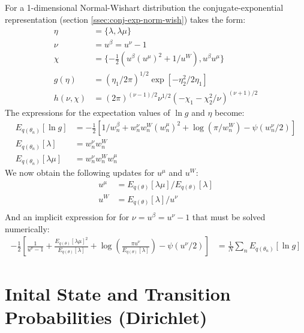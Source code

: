 For a 1-dimensional Normal-Wishart distribution the conjugate-exponential representation (section \ref{ssec:conj-exp-norm-wish}) takes the form:
\begin{align}
  \eta &= \{ \lambda, \lambda \mu \} \\
  \nu &= u^\beta = u^\nu - 1 \\
  \chi &= \{ -\tfrac{1}{2}(u^\beta (u^\mu)^2 + 1/u^W), u^\beta u^\mu \} \\
  g(\eta) &= (\eta_1 / 2\pi)^{1/2} \exp [-\eta_2^2 / 2 \eta_1] \\
  h(\nu, \chi) &= (2 \pi)^{(\nu-1)/2}  \nu^{1/2}  (-\chi_1 - \chi_2^2/\nu)^{(\nu+1)/2}
\end{align}
The expressions for the expectation values of $\ln g$ and $\eta$ become:
\begin{align}
  E_{q(\theta_n)} [ \ln g ] 
  &=
  - \frac{1}{2} [ 1 / w_n^{\beta} +  w_n^\nu w_n^W (w_n^\mu)^2
                   + \log(\pi / w_n^W) - \psi(w_n^\nu/2) ] \\
  E_{q(\theta_n)} [ \lambda ]
  &=
  w_n^\nu w_n^W \\
  E_{q(\theta_n)} [ \lambda \mu ]
  &=
  w_n^\nu w_n^W w_n^\mu
\end{align}
We now obtain the following updates for $u^\mu$ and $u^W$:
\begin{align}
  u^\mu &= E_{q(\theta)} [ \lambda \mu ] / E_{q(\theta)} [ \lambda ] \\
  u^W &= E_{q(\theta)} [ \lambda ] / u^\nu \\
\end{align}
And an implicit expression for for $\nu = u^\beta = u^\nu -1$ that must be solved numerically:
\begin{align}
    - \frac{1}{2} 
    \left[ 
      \frac{1}{u^\nu -1}
      +  \frac{E_{q(\theta)} [ \lambda \mu ]^2}{E_{q(\theta)} [ \lambda ]}
      + \log \left(
               \frac{\pi u^\nu}{E_{q(\theta)} [ \lambda ]}
             \right)
      - \psi(u^\nu/2) 
    \right] 
    &=
    \frac{1}{N} \sum_n E_{q(\theta_n)} [\ln g] 
\end{align}

\section{Inital State and Transition Probabilities (Dirichlet)}

